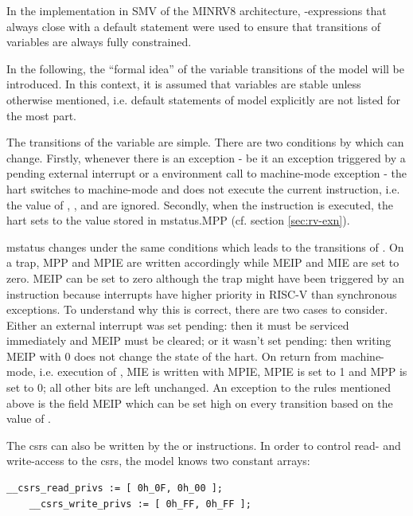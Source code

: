 In the implementation in SMV of the MINRV8 architecture, -expressions that always close with a default statement were used to ensure that transitions of variables are always fully constrained.

In the following, the \enquote{formal idea} of the variable transitions of the model will be introduced.
In this context, it is assumed that variables are stable unless otherwise mentioned, i.e. default statements of model explicitly are not listed for the most part.

The transitions of the  variable are simple.
There are two conditions by which  can change.
Firstly, whenever there is an exception - be it an exception triggered by a pending external interrupt or a environment call to machine-mode exception - the \gls{hart} switches to machine-mode and does not execute the current instruction, i.e. the value of , ,  and  are ignored.
Secondly, when the  instruction is executed, the \gls{hart} sets  to the value stored in \gls{mstatus}.MPP (cf. section \ref{sec:rv-exn}).

\gls{mstatus} changes under the same conditions which leads to the transitions of .
On a trap, MPP and MPIE are written accordingly while MEIP and MIE are set to zero.
MEIP can be set to zero although the trap might have been triggered by an  instruction because interrupts have higher priority in RISC-V than synchronous exceptions.
To understand why this is correct, there are two cases to consider.
Either an external interrupt was set pending: then it must be serviced immediately and MEIP must be cleared; or it wasn't set pending: then writing MEIP with 0 does not change the state of the \gls{hart}.
On return from machine-mode, i.e. execution of , MIE is written with MPIE, MPIE is set to 1 and MPP is set to 0; all other bits are left unchanged.
An exception to the rules mentioned above is the field MEIP which can be set high on every transition based on the value of .

The \glspl{csr} can also be written by the  or  instructions.
In order to control read- and write-access to the \glspl{csr}, the model knows two constant arrays:
\begin{lstlisting}[language=smv]
    __csrs_read_privs := [ 0h_0F, 0h_00 ];
    __csrs_write_privs := [ 0h_FF, 0h_FF ];
\end{lstlisting}

